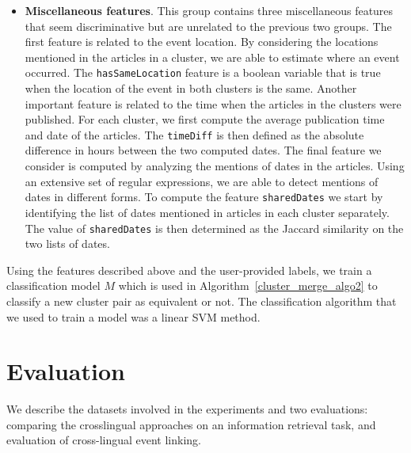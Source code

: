 \documentclass[twoside,11pt]{article}
\begin{document}
\begin{itemize}
\item {\bf Miscellaneous features}. This group contains three miscellaneous features that seem discriminative but are unrelated to the previous two groups. The first feature is related to the event location. By considering the locations mentioned in the articles in a cluster, we are able to estimate where an event occurred. The \texttt{hasSameLocation} feature is a boolean variable that is true when the location of the event in both clusters is the same. Another important feature is related to the time when the articles in the clusters were published. For each cluster, we first compute the average publication time and date of the articles. The \texttt{timeDiff} is then defined as the absolute difference in hours between the two computed dates. The final feature we consider is computed by analyzing the mentions of dates in the articles. Using an extensive set of regular expressions, we are able to detect mentions of dates in different forms. To compute the feature \texttt{sharedDates} we start by identifying the list of dates mentioned in articles in each cluster separately. The value of \texttt{sharedDates} is then determined as the Jaccard similarity on the two lists of dates.

\end{itemize}

Using the  features described above and the user-provided labels, we train a classification model $M$ which is used in Algorithm~\ref{cluster_merge_algo2} to classify a new cluster pair as equivalent or not. The classification algorithm that we used to train a model was a linear SVM method.




\section{Evaluation}

We describe the datasets involved in the experiments and two evaluations: comparing the crosslingual approaches on an information retrieval task, and evaluation of cross-lingual event linking.
\end{document}
